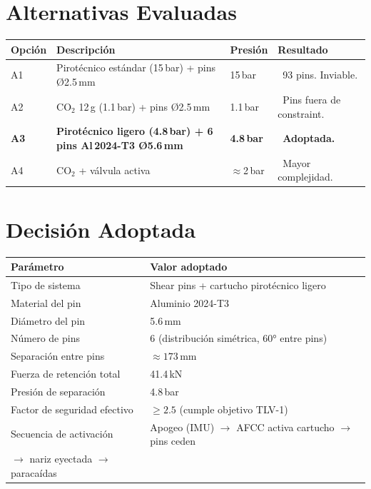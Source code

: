 \documentclass[11pt, a4paper]{article}
\newcommand{\yes}{\textcolor{tlvgreen}{\textbf{\ding{51}}}}
\newcommand{\no}{\textcolor{tlvred}{\textbf{\ding{55}}}}
\begin{document}
\section{Alternativas Evaluadas}

\vspace{6pt}
\begin{tabularx}{\linewidth}{lXll}
  \toprule
  \rowcolor{tlvnavy}
  \color{white}\textbf{Opción} & \color{white}\textbf{Descripción} & \color{white}\textbf{Presión} & \color{white}\textbf{Resultado} \\
  \midrule
  \rowcolor{tlvlight}
  A1 & Pirotécnico estándar (15\,bar) + pins Ø2.5\,mm & 15\,bar & \no\ 93 pins. Inviable. \\
  A2 & CO$_2$ 12\,g (1.1\,bar) + pins Ø2.5\,mm & 1.1\,bar & \no\ Pins fuera de constraint. \\
  \rowcolor{tlvlight}
  \textbf{A3} & \textbf{Pirotécnico ligero (4.8\,bar) + 6 pins Al\,2024-T3 Ø5.6\,mm} & \textbf{4.8\,bar} & \yes\ \textbf{Adoptada.} \\
  A4 & CO$_2$ + válvula activa & $\approx$2\,bar & \no\ Mayor complejidad. \\
  \bottomrule
\end{tabularx}

\section{Decisión Adoptada}

\vspace{6pt}
\begin{tabular}{ll}
  \toprule
  \rowcolor{tlvnavy}
  \color{white}\textbf{Parámetro} & \color{white}\textbf{Valor adoptado} \\
  \midrule
  \rowcolor{tlvlight} Tipo de sistema        & Shear pins + cartucho pirotécnico ligero \\
  Material del pin                           & Aluminio 2024-T3 \\
  \rowcolor{tlvlight} Diámetro del pin       & 5.6\,mm \\
  Número de pins                             & 6 (distribución simétrica, 60° entre pins) \\
  \rowcolor{tlvlight} Separación entre pins  & $\approx 173$\,mm \\
  Fuerza de retención total                  & 41.4\,kN \\
  \rowcolor{tlvlight} Presión de separación  & 4.8\,bar \\
  Factor de seguridad efectivo               & $\geq 2.5$ (cumple objetivo TLV-1) \\
  \rowcolor{tlvlight} Secuencia de activación & Apogeo (IMU) $\rightarrow$ AFCC activa cartucho $\rightarrow$ pins ceden\\$\rightarrow$ nariz eyectada $\rightarrow$ paracaídas \\
  \bottomrule
\end{tabular}
\end{document}
